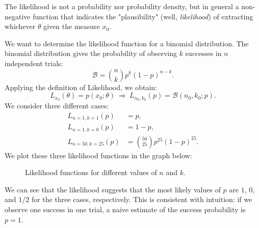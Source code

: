 The likelihood is not a probability nor probability density, but in general a non-negative function that indicates the "plausibility" (well, \emph{likelihood}) of extracting whichever $\theta$ given the measure $x_0$.
\begin{example}
	We want to determine the likelihood function for a binomial distribution. The binomial distribution gives the probability of observing $k$ successes in $n$ independent trials:
	\[
	\mathcal{B}=\binom{n}{k}p^k(1-p)^{n-k}.
	\]
	Applying the definition of Likelihood, we obtain:
	\[
	L_{x_0}(\theta)=p(x_0;\theta)\ \Rightarrow\ L_{n_0,k_0}(p)=\mathcal{B}(n_0,k_0;p).
	\]
	We consider three different cases:
	\begin{align*}
		L_{n=1,k=1}(p) &= p, \\
		L_{n=1,k=0}(p) &= 1-p, \\
		L_{n=50,k=25}(p) &= \binom{50}{25}p^{25}(1-p)^{25}.
	\end{align*}
	We plot these three likelihood functions in the graph below:
	\begin{figure}[H]
		\centering
		
		\caption{Likelihood functions for different values of $n$ and $k$.}
		\label{fig:binomial_likelihood}
	\end{figure}
	We can see that the likelihood suggests that the most likely values of $p$ are $1$, $0$, and $1/2$ for the three cases, respectively. This is consistent with intuition: if we observe one success in one trial, a naive estimate of the success probability is $p=1$.
\end{example}

